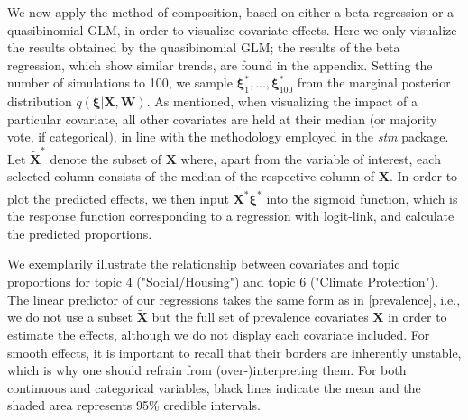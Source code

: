 \noindent We now apply the method of composition, based on either a beta regression or a quasibinomial GLM, in order to visualize covariate effects. Here we only visualize the results obtained by the quasibinomial GLM; the results of the beta regression, which show similar trends, are found in the appendix. Setting the number of simulations to 100, we sample $\boldsymbol{\xi}^*_1, \dots, \boldsymbol{\xi}^*_{100}$ from the  marginal posterior distribution $q(\boldsymbol{\xi} | \boldsymbol{X}, \boldsymbol{W})$. As mentioned, when visualizing the impact of a particular covariate, all other covariates are held at their median (or majority vote, if categorical), in line with the methodology employed in the \textit{stm} package.
Let $\tilde{\boldsymbol{X}}^*$ denote the subset of $\boldsymbol{X}$ where, apart from the variable of interest, each selected column consists of the median of the respective column of $\boldsymbol{X}$. In order to plot the predicted effects, we then input $\tilde{\boldsymbol{X}^*}\boldsymbol{\xi}^*$ into the sigmoid function, which is the response function corresponding to a regression with logit-link, and calculate the predicted proportions. 

We exemplarily illustrate the relationship between covariates and topic proportions for topic 4 ("Social/Housing") and topic 6 ("Climate Protection"). The linear predictor of our regressions takes the same form as in  \eqref{prevalence}, i.e., we do not use a subset $\tilde{\boldsymbol{X}}$ but the full set of prevalence covariates $\boldsymbol{X}$ in order to estimate the effects, although we do not display each covariate included. For smooth effects, it is important to recall that their borders are inherently unstable, which is why one should refrain from (over-)interpreting them. For both continuous and categorical variables, black lines indicate the mean and the shaded area represents 95\% credible intervals.


